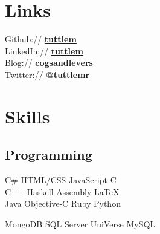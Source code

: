 \documentclass[letterpaper]{deedy-resume} %
\begin{document}
\begin{minipage}[t]{0.33\textwidth} %


\section{Links} 

Github:// \href{https://github.com/tuttlem}{\bf tuttlem} \\
LinkedIn:// \href{http://au.linkedin.com/in/tuttlem/}{\bf tuttlem} \\
Blog:// \href{http://cogsandlevers.blogspot.com/}{\bf cogsandlevers} \\
Twitter:// \href{https://twitter.com/tuttlemr}{\bf @tuttlemr} \\

\sectionspace %


\section{Skills}

\subsection{Programming}

C\# \textbullet{} HTML/CSS \textbullet{} JavaScript \textbullet{} C \\
C++ \textbullet{} Haskell \textbullet{} Assembly \textbullet{} \LaTeX\ \\ 
Java \textbullet{} Objective-C \textbullet{} Ruby \textbullet{} Python

\sectionspace %

MongoDB \textbullet{} SQL Server 
UniVerse \textbullet{} MySQL 



\end{minipage} %
\hfill
%
\end{document}
